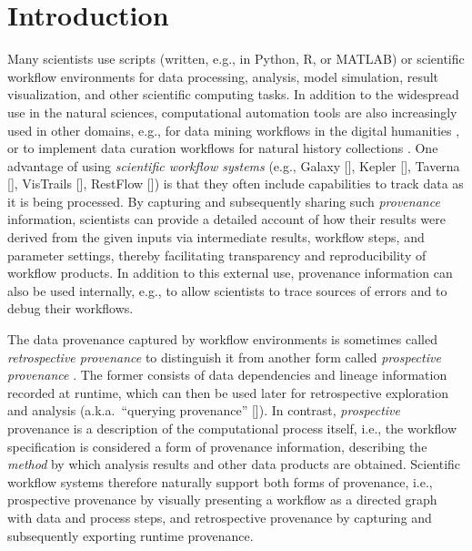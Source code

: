 \documentclass[15]{idcc}
\newcommand{\R}{R}
\newcommand{\MATLAB}{MATLAB}
\begin{document}
\section{Introduction}

Many scientists use scripts (written, e.g., in Python, \R, or \MATLAB)
or scientific workflow environments for data processing, analysis,
model simulation, result visualization, and other scientific computing
tasks. In addition to the widespread use in the natural sciences,
computational automation tools are also increasingly used in other
domains, e.g., for data mining workflows in the digital humanities
\cite{van2012if}, or to implement data curation workflows for natural
history collections \cite{Dou2012kurator}. One advantage of using
\emph{scientific workflow systems} (e.g., Galaxy [],
Kepler [], Taverna [],
VisTrails [], RestFlow
[]) %
is that they often include capabilities to track data as it is being
processed. By capturing and subsequently sharing such
\emph{provenance} information, scientists can provide a detailed
account of how their results were derived from the given inputs via
intermediate results, workflow steps, and parameter settings, thereby
facilitating transparency and reproducibility of workflow products. In
addition to this external use, provenance information can also be used
internally, e.g., to allow scientists to trace sources of errors and
to debug their workflows.

  The data provenance captured by workflow environments is sometimes
  called \emph{retrospective provenance} to distinguish it from
  another form called \emph{prospective provenance}
  \cite{Clifford2008original,Lim2010Prospective}. The former consists
  of data dependencies and lineage information recorded at runtime,
  which can then be used later for retrospective exploration and
  analysis (a.k.a.\ ``querying provenance''
  []). In contrast, \emph{prospective}
  provenance is a description of the computational process itself,
  i.e., the workflow specification is considered a form of provenance
  information, describing the \emph{method} by which analysis results
  and other data products are obtained. Scientific workflow systems
  therefore naturally support both forms of provenance, i.e.,
  prospective provenance by visually presenting a workflow as a
  directed graph with data and process steps, and retrospective
  provenance by capturing and subsequently exporting runtime
  provenance.
\end{document}
